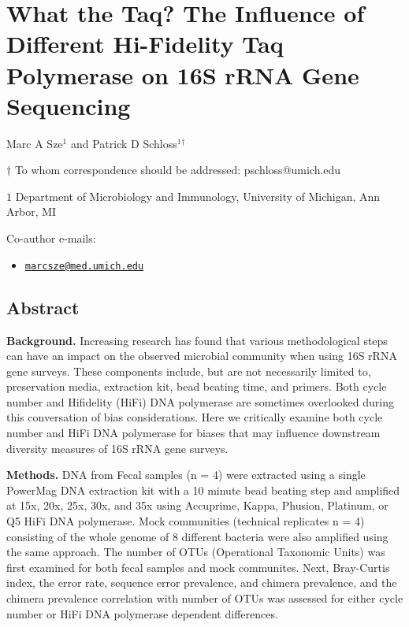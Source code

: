\documentclass[12pt,]{article}
\title{}
\author{}
\date{}
\providecommand{\tightlist}{%
  \setlength{\itemsep}{0pt}\setlength{\parskip}{0pt}}
\begin{document}
\section{What the Taq? The Influence of Different Hi-Fidelity Taq
Polymerase on 16S rRNA Gene
Sequencing}\label{what-the-taq-the-influence-of-different-hi-fidelity-taq-polymerase-on-16s-rrna-gene-sequencing}

\begin{center}
\vspace{25mm}

Marc A Sze${^1}$ and Patrick D Schloss${^1}$${^\dagger}$

\vspace{20mm}

$\dagger$ To whom correspondence should be addressed: pschloss@umich.edu

$1$ Department of Microbiology and Immunology, University of Michigan, Ann Arbor, MI




\end{center}

Co-author e-mails:

\begin{itemize}
\tightlist
\item
  \href{mailto:marcsze@med.umich.edu}{\nolinkurl{marcsze@med.umich.edu}}
\end{itemize}

\newpage

\linenumbers

\subsection{Abstract}\label{abstract}

\textbf{Background.} Increasing research has found that various
methodological steps can have an impact on the observed microbial
community when using 16S rRNA gene surveys. These components include,
but are not necessarily limited to, preservation media, extraction kit,
bead beating time, and primers. Both cycle number and Hifidelity (HiFi)
DNA polymerase are sometimes overlooked during this conversation of bias
considerations. Here we critically examine both cycle number and HiFi
DNA polymerase for biases that may influence downstream diversity
measures of 16S rRNA gene surveys.

\textbf{Methods.} DNA from Fecal samples (n = 4) were extracted using a
single PowerMag DNA extraction kit with a 10 minute bead beating step
and amplified at 15x, 20x, 25x, 30x, and 35x using Accuprime, Kappa,
Phusion, Platinum, or Q5 HiFi DNA polymerase. Mock communities
(technical replicates n = 4) consisting of the whole genome of 8
different bacteria were also amplified using the same approach. The
number of OTUs (Operational Taxonomic Units) was first examined for both
fecal samples and mock communites. Next, Bray-Curtis index, the error
rate, sequence error prevalence, and chimera prevalence, and the chimera
prevalence correlation with number of OTUs was assessed for either cycle
number or HiFi DNA polymerase dependent differences.
\end{document}
